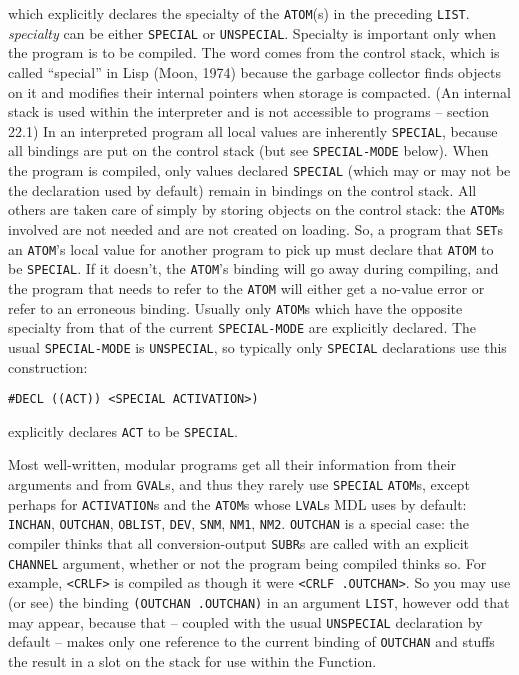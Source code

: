 \documentclass[a4paper]{scrbook}
\begin{document}
which explicitly declares the specialty of the \texttt{ATOM}(s) in the preceding \texttt{LIST}. \emph{specialty} can be
either \texttt{SPECIAL}  or \texttt{UNSPECIAL}. Specialty
is important only when the program is to be compiled. The word comes from the control stack, which is called ``special'' in
Lisp (Moon, 1974) because the garbage collector finds objects on it and modifies their internal pointers when storage is
compacted. (An internal stack is used within the interpreter and is not accessible to programs -- section 22.1) In an
interpreted program all local values are inherently \texttt{SPECIAL}, because all bindings are put on the control stack
(but see \texttt{SPECIAL-MODE}  below). When the program is compiled, only values declared
\texttt{SPECIAL} (which may or may not be the declaration used by default) remain in bindings on the control stack. All
others are taken care of simply by storing objects on the control stack: the \texttt{ATOM}s involved are not needed and are
not created on loading. So, a program that \texttt{SET}s an \texttt{ATOM}'s local value for another program to pick up must
declare that \texttt{ATOM} to be \texttt{SPECIAL}. If it doesn't, the \texttt{ATOM}'s binding will go away during
compiling, and the program that needs to refer to the \texttt{ATOM} will either get a no-value error or refer to an
erroneous binding. Usually only \texttt{ATOM}s which have the opposite specialty from that of the current
\texttt{SPECIAL-MODE} are explicitly declared. The usual \texttt{SPECIAL-MODE} is \texttt{UNSPECIAL}, so typically only
\texttt{SPECIAL} declarations use this construction:

\begin{verbatim}
#DECL ((ACT)) <SPECIAL ACTIVATION>)
\end{verbatim}

explicitly declares \texttt{ACT} to be \texttt{SPECIAL}.

Most well-written, modular programs get all their information from their arguments and from \texttt{GVAL}s, and thus they
rarely use \texttt{SPECIAL} \texttt{ATOM}s, except perhaps for \texttt{ACTIVATION}s and the \texttt{ATOM}s whose
\texttt{LVAL}s MDL uses by default: \texttt{INCHAN}, \texttt{OUTCHAN}, \texttt{OBLIST},
\texttt{DEV}, \texttt{SNM}, \texttt{NM1}, \texttt{NM2}. \texttt{OUTCHAN} is a special case: the compiler thinks that all
conversion-output \texttt{SUBR}s are called with an explicit \texttt{CHANNEL} argument, whether or not the program being
compiled thinks so. For example, \texttt{\textless{}CRLF\textgreater{}} is compiled as though it were
\texttt{\textless{}CRLF\ .OUTCHAN\textgreater{}}. So you may use (or see) the binding \texttt{(OUTCHAN\ .OUTCHAN)} in an
argument \texttt{LIST}, however odd that may appear, because that -- coupled with the usual \texttt{UNSPECIAL} declaration
by default -- makes only one reference to the current binding of \texttt{OUTCHAN} and stuffs the result in a slot on the
stack for use within the Function.
\end{document}
